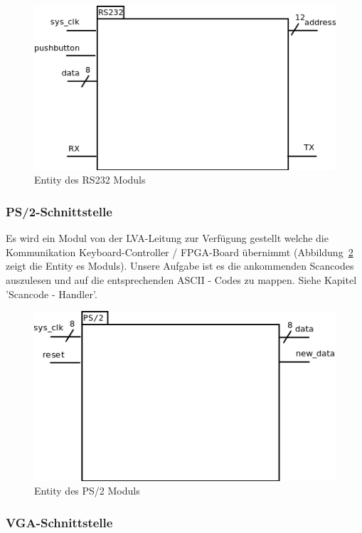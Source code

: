 \begin{figure}[!ht]
	\centering
	\includegraphics[scale=0.3]{figures/entity_rs232.png} 
	\caption{Entity des RS232 Moduls}
	\label{fig:entity_rs232}
\end{figure}

\subsubsection{PS/2-Schnittstelle}

Es wird ein Modul von der LVA-Leitung zur Verfügung gestellt welche die Kommunikation Keyboard-Controller / FPGA-Board übernimmt (Abbildung~\ref{fig:entity_ps2} zeigt die Entity es Moduls). Unsere Aufgabe ist es die ankommenden Scancodes auszulesen und auf die entsprechenden ASCII - Codes zu mappen. Siehe Kapitel 'Scancode - Handler'.

\begin{figure}[!ht]
	\centering
	\includegraphics[scale=0.3]{figures/entity_ps2.png} 
	\caption{Entity des PS/2 Moduls}
	\label{fig:entity_ps2}
\end{figure}

\subsubsection{VGA-Schnittstelle}

